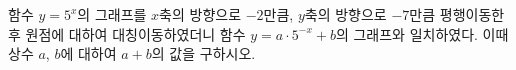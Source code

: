 함수 $y=5^{x}$의 그래프를 $x$축의 방향으로 $-2$만큼, $y$축의 방향으로 $-7$만큼 평행이동한 후 원점에 대하여 대칭이동하였더니 함수 $y=a\cdot 5^{-x}+b$의 그래프와 일치하였다. 이때 상수 $a$, $b$에 대하여 $a+b$의 값을 구하시오.
